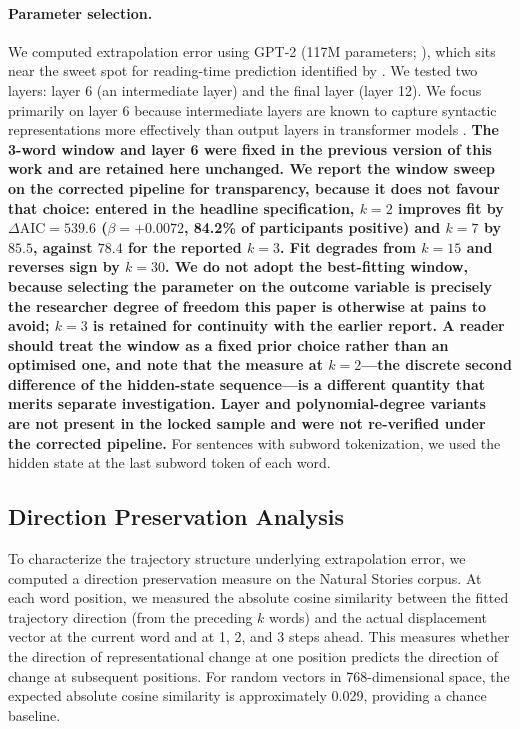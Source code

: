 \documentclass[12pt]{article}
\newcommand{\new}[1]{{\bfseries #1}}
\begin{document}
\paragraph{Parameter selection.} We computed extrapolation error using GPT-2 (117M parameters; \citealp{radford2019}), which sits near the sweet spot for reading-time prediction identified by \citet{oh2023a}. We tested two layers: layer 6 (an intermediate layer) and the final layer (layer 12). We focus primarily on layer 6 because intermediate layers are known to capture syntactic representations more effectively than output layers in transformer models \citep{hewitt2019,jawahar2019}. \new{The 3-word window and layer 6 were fixed in the previous version of this work and are retained here unchanged. We report the window sweep on the corrected pipeline for transparency, because it does not favour that choice: entered in the headline specification, $k = 2$ improves fit by $\Delta\text{AIC} = 539.6$ ($\beta = +0.0072$, 84.2\% of participants positive) and $k = 7$ by $85.5$, against $78.4$ for the reported $k = 3$. Fit degrades from $k = 15$ and reverses sign by $k = 30$. We do not adopt the best-fitting window, because selecting the parameter on the outcome variable is precisely the researcher degree of freedom this paper is otherwise at pains to avoid; $k = 3$ is retained for continuity with the earlier report. A reader should treat the window as a fixed prior choice rather than an optimised one, and note that the measure at $k = 2$---the discrete second difference of the hidden-state sequence---is a different quantity that merits separate investigation. Layer and polynomial-degree variants are not present in the locked sample and were not re-verified under the corrected pipeline.} For sentences with subword tokenization, we used the hidden state at the last subword token of each word.

\subsection{Direction Preservation Analysis}

To characterize the trajectory structure underlying extrapolation error, we computed a direction preservation measure on the Natural Stories corpus. At each word position, we measured the absolute cosine similarity between the fitted trajectory direction (from the preceding $k$ words) and the actual displacement vector at the current word and at 1, 2, and 3 steps ahead. This measures whether the direction of representational change at one position predicts the direction of change at subsequent positions. For random vectors in 768-dimensional space, the expected absolute cosine similarity is approximately 0.029, providing a chance baseline.
\end{document}
